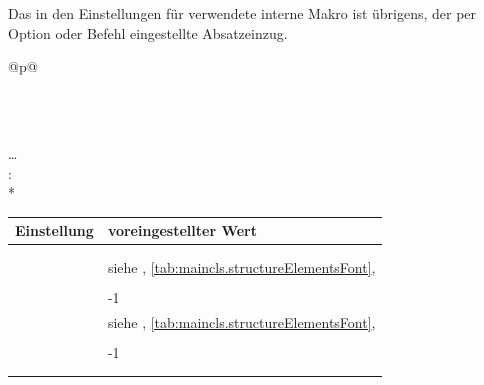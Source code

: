 Das in den Einstellungen für  verwendete
interne Makro  ist übrigens, der per Option
 oder Befehl
 eingestellte Absatzeinzug.%
  \begin{longtable}{@{}p{\columnwidth}@{}}
    \caption{Voreinstellungen für die Formatierung der Überschriften von
       und }%
    \label{tab:maincls.section.defaults}\\
    \endfirsthead
    \caption[]{Voreinstellungen für die Formatierung der Überschriften von
       und
       \emph{(Fortsetzung)}}\\
    \addlinespace[-\normalbaselineskip] \endhead
    \raggedleft\dots\\
    \endfoot \endlastfoot
    : \\*
    \begin{tabularx}{\linewidth}{ll}
    \toprule
    Einstellung & voreingestellter Wert \\
    \midrule
    \PValue{afterskip}   & \PValue{0pt plus 1fil} \\
    \PValue{beforeskip}  & \PValue{0pt plus 1fil + \Length{baselineskip}} \\
    \PValue{font}        & siehe  \DescRef{maincls.fontelement.part},
                           \autoref{tab:maincls.structureElementsFont},
                           \autopageref{tab:maincls.structureElementsFont} \\
    \PValue{innerskip}   & \PValue{20pt} \\
    \PValue{level}       & -1 \\
    \PValue{prefixfont}  & siehe
                           \DescRef{maincls.fontelement.partnumber},
                           \autoref{tab:maincls.structureElementsFont},
                           \autopageref{tab:maincls.structureElementsFont} \\
    \PValue{tocindent}   & \PValue{0pt} \\
    \PValue{toclevel}    & -1 \\
    \PValue{tocnumwidth} & \PValue{2em} \\
    \PValue{tocstyle}    & \PValue{part} \\
    \bottomrule
    \end{tabularx} \\
    \addlinespace[\normalbaselineskip]

\end{longtable}
